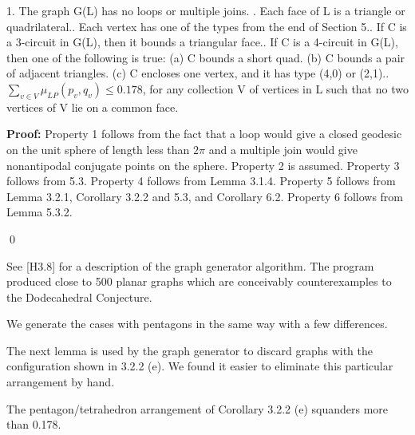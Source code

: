 1. The graph G(L) has no loops or multiple joins. . Each face of L is a triangle or quadrilateral.. Each vertex has one of the types from the end of Section 5.. If C is a 3-circuit in G(L), then it bounds a triangular face.. If C is a 4-circuit in G(L), then one of the following is true:\newline
(a) C bounds a short quad. \newline
(b) C bounds a pair of adjacent triangles.\newline
(c) C encloses one vertex, and it has type (4,0) or (2,1).. $\sum_{v\in V} \mu_{LP}(p_v,q_v) \leq 0.178$, for any collection V of vertices in L such that no two vertices of V lie on a common face. \newline 


\bigskip

{\bf Proof:} Property 1 follows from the fact that a loop would give a closed geodesic on the unit sphere of length less than $2\pi$ and a multiple join would give nonantipodal conjugate points on the sphere. \newline 
Property 2 is assumed.  \newline
Property 3 follows from 5.3. \newline 
Property 4 follows from Lemma 3.1.4. \newline 
Property 5 follows from Lemma 3.2.1, Corollary 3.2.2 and 5.3, and Corollary 6.2.\newline 
Property 6 follows from Lemma 5.3.2. \newline 

\qed


See [H3.8] for a description of the graph generator algorithm.  The program produced close to 500 planar graphs which are conceivably counterexamples to the Dodecahedral Conjecture.

We generate the cases with pentagons in the same way with a few differences.

The next lemma is used by the graph generator to discard graphs with 
the configuration shown in 3.2.2 (e).  We found it easier to eliminate this
particular arrangement by hand.

 The  pentagon/tetrahedron arrangement of Corollary 3.2.2 (e) squanders more than 0.178. \endproclaim

